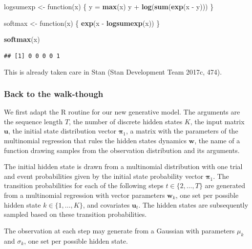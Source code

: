 \documentclass[]{article}
\newenvironment{Shaded}{\begin{snugshade}}{\end{snugshade}}
\newcommand{\KeywordTok}[1]{\textcolor[rgb]{0.13,0.29,0.53}{\textbf{{#1}}}}
\newcommand{\StringTok}[1]{\textcolor[rgb]{0.31,0.60,0.02}{{#1}}}
\newcommand{\NormalTok}[1]{{#1}}
\newcommand{\mat}[1]{\mathbf{#1}}
\begin{document}
\begin{Shaded}
\begin{Highlighting}[]
\NormalTok{logsumexp <-}\StringTok{ }\NormalTok{function(x) \{}
  \NormalTok{y =}\StringTok{ }\KeywordTok{max}\NormalTok{(x)}
  \NormalTok{y +}\StringTok{ }\KeywordTok{log}\NormalTok{(}\KeywordTok{sum}\NormalTok{(}\KeywordTok{exp}\NormalTok{(x -}\StringTok{ }\NormalTok{y)))}
\NormalTok{\}}

\NormalTok{softmax <-}\StringTok{ }\NormalTok{function(x) \{}
  \KeywordTok{exp}\NormalTok{(x -}\StringTok{ }\KeywordTok{logsumexp}\NormalTok{(x))}
\NormalTok{\}}

\KeywordTok{softmax}\NormalTok{(x)}
\end{Highlighting}
\end{Shaded}

\begin{verbatim}
## [1] 0 0 0 0 1
\end{verbatim}

This is already taken care in Stan (Stan Development Team 2017c, 474).

\subsubsection{Back to the walk-though}\label{back-to-the-walk-though}

We first adapt the R routine for our new generative model. The arguments
are the sequence length \(T\), the number of discrete hidden states
\(K\), the input matrix \(\mat{u}\), the initial state distribution
vector \(\mat{\pi}_1\), a matrix with the parameters of the multinomial
regression that rules the hidden states dynamics \(\mat{w}\), the name
of a function drawing samples from the observation distribution and its
arguments.

The initial hidden state is drawn from a multinomial distribution with
one trial and event probabilities given by the initial state probability
vector \(\mat{\pi}_1\). The transition probabilities for each of the
following steps \(t \in \{2, \dots, T\}\) are generated from a
multinomial regression with vector parameters \(\mat{w}_k\), one set per
possible hidden state \(k \in \{1, \dots, K\}\), and covariates
\(\mat{u}_t\). The hidden states are subsequently sampled based on these
transition probabilities.

The observation at each step may generate from a Gaussian with
parameters \(\mu_k\) and \(\sigma_k\), one set per possible hidden
state.
\end{document}
